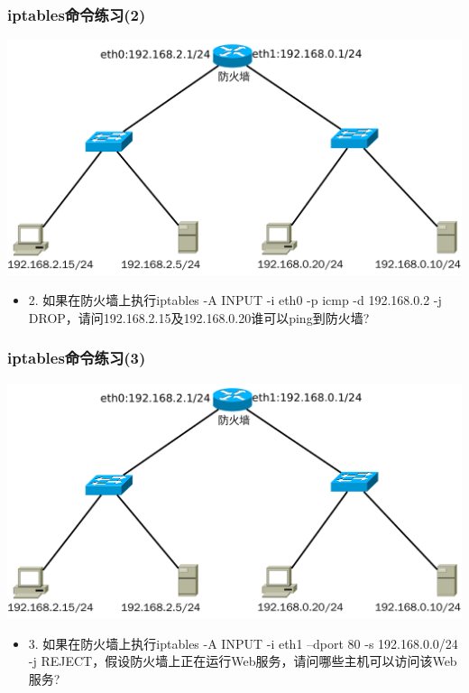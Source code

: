 \documentclass[xcolor=svgnames,presentation]{beamer}
\begin{document}
\begin{frame}
\frametitle{iptables命令练习(2)}
\label{sec-2-30}
\label{sec-2-30-1}

\includegraphics[width=.9\linewidth]{img/iptables-test.pdf}
\begin{itemize}

\item 2. 如果在防火墙上执行iptables -A INPUT -i eth0 -p icmp -d 192.168.0.2 -j DROP，请问192.168.2.15及192.168.0.20谁可以ping到防火墙?
\label{sec-2-30-2}%
\end{itemize} %
\end{frame}
\begin{frame}
\frametitle{iptables命令练习(3)}
\label{sec-2-31}
\label{sec-2-31-1}

\includegraphics[width=.9\linewidth]{img/iptables-test.pdf}
\begin{itemize}

\item 3. 如果在防火墙上执行iptables -A INPUT -i eth1 --dport 80 -s 192.168.0.0/24 -j REJECT，假设防火墙上正在运行Web服务，请问哪些主机可以访问该Web服务?
\label{sec-2-31-2}%
\end{itemize} %
\end{frame}
\end{document}
